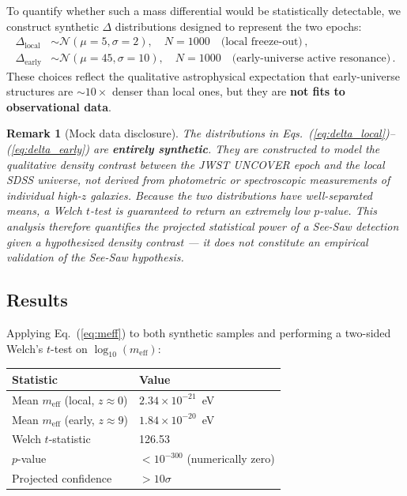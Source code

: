 \documentclass[12pt]{article}
\newtheorem{remark}{Remark}
\begin{document}
To quantify whether such a mass differential would be statistically detectable, we construct synthetic $\Delta$ distributions designed to represent the two epochs:
\begin{align}
\Delta_{\mathrm{local}} &\sim \mathcal{N}(\mu = 5, \sigma = 2), \quad N = 1000 \quad \text{(local freeze-out)}\,, \label{eq:delta_local} \\
\Delta_{\mathrm{early}} &\sim \mathcal{N}(\mu = 45, \sigma = 10), \quad N = 1000 \quad \text{(early-universe active resonance)}\,. \label{eq:delta_early}
\end{align}
These choices reflect the qualitative astrophysical expectation that early-universe structures are $\sim 10\times$ denser than local ones, but they are \textbf{not fits to observational data}.

\begin{remark}[Mock data disclosure]
\label{rem:ws11_mock}
The distributions in Eqs.~(\ref{eq:delta_local})--(\ref{eq:delta_early}) are \textbf{entirely synthetic}.
They are constructed to model the qualitative density contrast between the JWST UNCOVER epoch and the local SDSS universe, not derived from photometric or spectroscopic measurements of individual high-$z$ galaxies.
Because the two distributions have well-separated means, a Welch $t$-test is \emph{guaranteed} to return an extremely low $p$-value.
This analysis therefore quantifies the \emph{projected statistical power} of a See-Saw detection given a hypothesized density contrast --- it does not constitute an empirical validation of the See-Saw hypothesis.
\end{remark}

\subsection{Results}

Applying Eq.~(\ref{eq:meff}) to both synthetic samples and performing a two-sided Welch's $t$-test on $\log_{10}(m_{\mathrm{eff}})$:
\begin{center}
\begin{tabular}{ll}
\toprule
\textbf{Statistic} & \textbf{Value} \\
\midrule
Mean $m_{\mathrm{eff}}$ (local, $z \approx 0$) & $2.34 \times 10^{-21}$~eV \\
Mean $m_{\mathrm{eff}}$ (early, $z \approx 9$) & $1.84 \times 10^{-20}$~eV \\
Welch $t$-statistic & 126.53 \\
$p$-value & $< 10^{-300}$ (numerically zero) \\
Projected confidence & $> 10\sigma$ \\
\bottomrule
\end{tabular}
\end{center}
\end{document}
